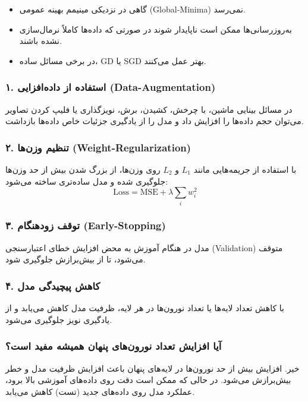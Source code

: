 \begin{itemize}
	\item گاهی در نزدیکی مینیمم بهینه عمومی (Global-Minima) نمی‌رسد.
	\item به‌روزرسانی‌ها ممکن است ناپایدار شوند در صورتی که داده‌ها کاملاً نرمال‌سازی نشده باشند.
	\item در برخی مسائل ساده، GD یا SGD بهتر عمل می‌کنند.
\end{itemize}




\subsubsection*{۱. استفاده از داده‌افزایی (Data-Augmentation)}
در مسائل بینایی ماشین، با چرخش، کشیدن، برش، نویزگذاری یا فلیپ کردن تصاویر می‌توان حجم داده‌ها را افزایش داد و مدل را از یادگیری جزئیات خاص داده‌ها بازداشت.

\subsubsection*{۲. تنظیم وزن‌ها (Weight-Regularization)}
با استفاده از جریمه‌هایی مانند $L_1$ و $L_2$ روی وزن‌ها، از بزرگ شدن بیش از حد وزن‌ها جلوگیری شده و مدل ساده‌تری ساخته می‌شود:
\[
\text{Loss} = \text{MSE} + \lambda \sum_i w_i^2
\]

\subsubsection*{۳. توقف زودهنگام (Early-Stopping)}
مدل در هنگام آموزش به محض افزایش خطای اعتبارسنجی (Validation) متوقف می‌شود، تا از بیش‌برازش جلوگیری شود.

\subsubsection*{۴. کاهش پیچیدگی مدل}
با کاهش تعداد لایه‌ها یا تعداد نورون‌ها در هر لایه، ظرفیت مدل کاهش می‌یابد و از یادگیری نویز جلوگیری می‌شود.

\subsubsection*{آیا افزایش تعداد نورون‌های پنهان همیشه مفید است؟}
خیر. افزایش بیش از حد نورون‌ها در لایه‌های پنهان باعث افزایش ظرفیت مدل و خطر بیش‌برازش می‌شود. در حالی که ممکن است دقت روی داده‌های آموزشی بالا برود، عملکرد مدل روی داده‌های جدید (تست) کاهش می‌یابد.

